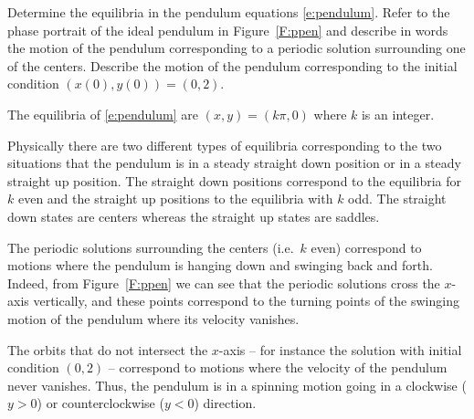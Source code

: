 \documentclass{ximera}
\begin{document}
\begin{exercise} \label{c14.7.9}
Determine the equilibria in the pendulum equations \eqref{e:pendulum}.
Refer to the phase portrait of the ideal pendulum in Figure~\ref{F:ppen}
and describe in words the motion of the pendulum corresponding to a periodic 
solution surrounding one of the centers.  Describe the motion of the 
pendulum corresponding to the initial condition $(x(0),y(0))=(0,2)$.

\begin{solution}
\ans The equilibria of \eqref{e:pendulum} are
$(x,y)=(k\pi,0)$ where $k$ is an integer.

\soln Physically there are two different types of equilibria corresponding
to the two situations that the pendulum is in a steady straight down
position or in a steady straight up position.  The straight down
positions correspond to the equilibria for $k$ even and the straight
up positions to the equilibria with $k$ odd.  The straight down
states are centers whereas the straight up states are saddles.

The periodic solutions surrounding the centers (i.e.\ $k$ even) correspond to 
motions where the pendulum is hanging down and swinging back and forth.
Indeed, from Figure~\ref{F:ppen} we can see that the periodic solutions
cross the $x$-axis vertically, and these points correspond to the turning
points of the swinging motion of the pendulum where its velocity vanishes.

The orbits that do not intersect the $x$-axis -- for instance the
solution with initial condition $(0,2)$ -- correspond to motions where
the velocity of the pendulum never vanishes.  Thus, the pendulum is
in a spinning motion going in a clockwise ($y>0$) or counterclockwise
($y<0$) direction.



\end{solution}
\end{exercise}
\end{document}
